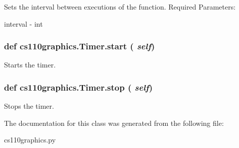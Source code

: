 Sets the interval between executions of the function. Required Parameters:
\begin{DoxyItemize}
\item interval -\/ int 
\end{DoxyItemize}\hypertarget{classcs110graphics_1_1Timer_afe14c3fd66571d0186a54a4075f31b7e}{
\subsubsection[{start}]{\setlength{\rightskip}{0pt plus 5cm}def cs110graphics.Timer.start ( {\em self})}}
\label{classcs110graphics_1_1Timer_afe14c3fd66571d0186a54a4075f31b7e}


Starts the timer. \hypertarget{classcs110graphics_1_1Timer_a26ae5eb7c7da929f7e2b6e17e4b709b1}{
\subsubsection[{stop}]{\setlength{\rightskip}{0pt plus 5cm}def cs110graphics.Timer.stop ( {\em self})}}
\label{classcs110graphics_1_1Timer_a26ae5eb7c7da929f7e2b6e17e4b709b1}


Stops the timer. 

The documentation for this class was generated from the following file:\begin{DoxyCompactItemize}
\item 
cs110graphics.py\end{DoxyCompactItemize}
